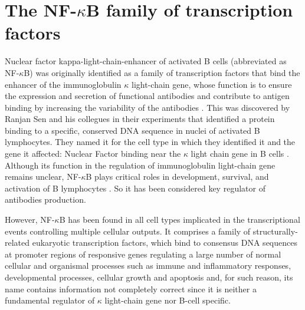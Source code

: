 \documentclass[12pt,a4paper]{report}
\begin{document}
\chapter{The NF-\texorpdfstring{$\kappa$}{}B family of transcription factors}



Nuclear factor kappa-light-chain-enhancer of activated B cells (abbreviated as NF-$\kappa$B) was originally identified as a family of transcription factors that bind the enhancer of the immunoglobulin $\kappa$ light-chain gene, whose function is to ensure the expression and secretion of functional antibodies and contribute to antigen binding by increasing the variability of the antibodies \cite{immunoglobulin}. This was discovered by Ranjan Sen and his collegues in their experiments that identified a protein binding to a specific, conserved DNA sequence in nuclei of activated B lymphocytes. They named it for the cell type in which they identified it and the gene it affected: Nuclear Factor binding near the $\kappa$ light chain gene in B cells \cite{nfkb30years}. Although its function in the regulation of immunoglobulin light-chain gene remains unclear, NF-$\kappa$B plays critical roles in development, survival, and activation of B lymphocytes \cite{Immuno}. So it has been considered key regulator of antibodies production. 

However, NF-$\kappa$B has been found in all cell types implicated in the transcriptional events controlling multiple cellular outputs. It comprises a family of structurally-related eukaryotic transcription factors, which bind to consensus DNA sequences at promoter regions of responsive genes regulating a large number of normal cellular and organismal processes such as immune and inflammatory responses, developmental processes, cellular growth and apoptosis and, for such reason, its name contains information not completely correct since it is neither a fundamental regulator of $\kappa$ light-chain gene nor B-cell specific.
\end{document}
